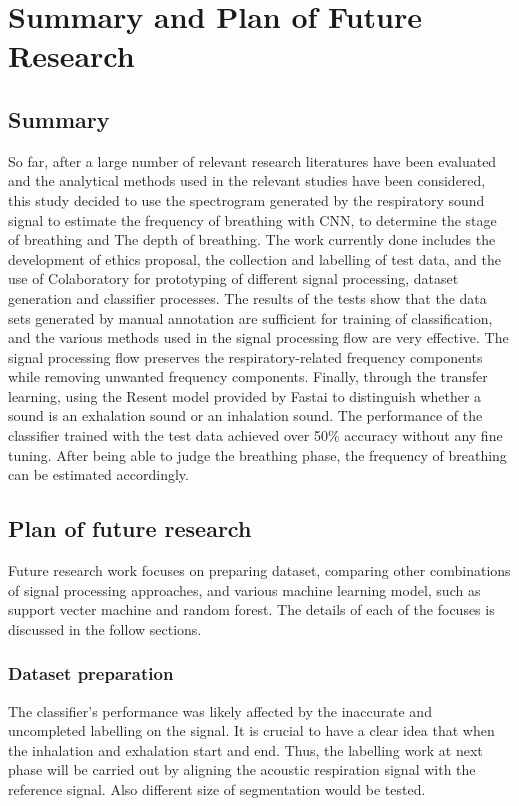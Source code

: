 \chapter{Summary and Plan of Future Research}
\section{Summary}
So far, after a large number of relevant research literatures have been evaluated and the analytical methods used in the relevant studies have been considered, this study decided to use the spectrogram generated by the respiratory sound signal to estimate the frequency of breathing with CNN, to determine the stage of breathing and The depth of breathing. The work currently done includes the development of ethics proposal, the collection and labelling of test data, and the use of Colaboratory for prototyping of different signal processing, dataset generation and classifier processes. The results of the tests show that the data sets generated by manual annotation are sufficient for training of classification, and the various methods used in the signal processing flow are very effective. The signal processing flow preserves the respiratory-related frequency components while removing unwanted frequency components. Finally, through the transfer learning, using the Resent model provided by Fastai to distinguish whether a sound is an exhalation sound or an inhalation sound. The performance of the classifier trained with the test data achieved over 50\% accuracy without any fine tuning. After being able to judge the breathing phase, the frequency of breathing can be estimated accordingly.
\section{Plan of future research}
Future research work focuses on preparing dataset, comparing other combinations of signal processing approaches, and various machine learning model, such as support vecter machine and random forest. The details of each of the focuses is discussed in the follow sections.

\subsection{Dataset preparation}

The classifier's performance was likely affected by the inaccurate and uncompleted labelling on the signal. It is crucial to have a clear idea that when the inhalation and exhalation start and end. Thus, the labelling work at next phase will be carried out by aligning the acoustic respiration signal with the reference signal. Also different size of segmentation would be tested.

